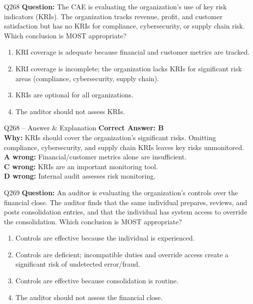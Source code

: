 \documentclass[aspectratio=169,10pt]{beamer}
\begin{document}
	\begin{frame}[t]{Q268}
		\small
		\textbf{Question:} The CAE is evaluating the organization's use of key risk indicators (KRIs). The organization tracks revenue, profit, and customer satisfaction but has no KRIs for compliance, cybersecurity, or supply chain risk. Which conclusion is MOST appropriate?
		\begin{enumerate}[label=\Alph*.,itemsep=1pt,topsep=2pt]
			\item KRI coverage is adequate because financial and customer metrics are tracked.
			\item KRI coverage is incomplete; the organization lacks KRIs for significant risk areas (compliance, cybersecurity, supply chain).
			\item KRIs are optional for all organizations.
			\item The auditor should not assess KRIs.
		\end{enumerate}
	\end{frame}
	
	\begin{frame}[t]{Q268 -- Answer \& Explanation}
		\small
		\textbf{Correct Answer: B} \\[4pt]
		\textbf{Why:} KRIs should cover the organization's significant risks. Omitting compliance, cybersecurity, and supply chain KRIs leaves key risks unmonitored. \\[4pt]
		\textbf{A wrong:} Financial/customer metrics alone are insufficient. \\[2pt]
		\textbf{C wrong:} KRIs are an important monitoring tool. \\[2pt]
		\textbf{D wrong:} Internal audit assesses risk monitoring.
	\end{frame}
	
	\begin{frame}[t]{Q269}
		\small
		\textbf{Question:} An auditor is evaluating the organization's controls over the financial close. The auditor finds that the same individual prepares, reviews, and posts consolidation entries, and that the individual has system access to override the consolidation. Which conclusion is MOST appropriate?
		\begin{enumerate}[label=\Alph*.,itemsep=1pt,topsep=2pt]
			\item Controls are effective because the individual is experienced.
			\item Controls are deficient; incompatible duties and override access create a significant risk of undetected error/fraud.
			\item Controls are effective because consolidation is routine.
			\item The auditor should not assess the financial close.
		\end{enumerate}
	\end{frame}
	
\end{document}
